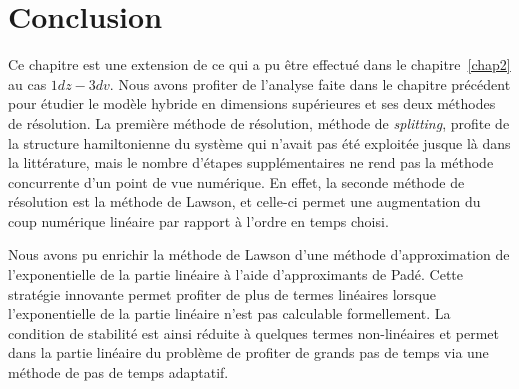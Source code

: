 
\section{Conclusion}


Ce chapitre est une extension de ce qui a pu être effectué dans le chapitre~\ref{chap2} au cas $1dz-3dv$. Nous avons profiter de l'analyse faite dans le chapitre précédent pour étudier le modèle hybride en dimensions supérieures et ses deux méthodes de résolution. La première méthode de résolution, méthode de \emph{splitting}, profite de la structure hamiltonienne du système qui n'avait pas été exploitée jusque là dans la littérature, mais le nombre d'étapes supplémentaires ne rend pas la méthode concurrente d'un point de vue numérique. En effet, la seconde méthode de résolution est la méthode de Lawson, et celle-ci permet une augmentation du coup numérique linéaire par rapport à l'ordre en temps choisi.

Nous avons pu enrichir la méthode de Lawson d'une méthode d'approximation de l'exponentielle de la partie linéaire à l'aide d'approximants de Padé. Cette stratégie innovante permet profiter de plus de termes linéaires lorsque l'exponentielle de la partie linéaire n'est pas calculable formellement. La condition de stabilité est ainsi réduite à quelques termes non-linéaires et permet dans la partie linéaire du problème de profiter de grands pas de temps via une méthode de pas de temps adaptatif.

